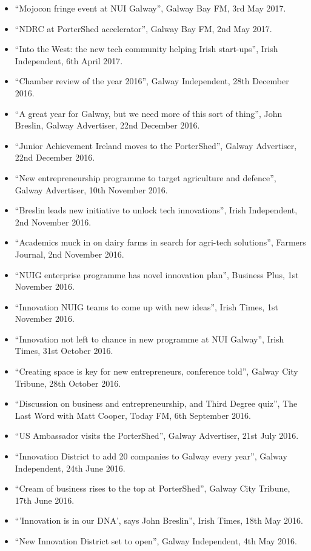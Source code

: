 \documentclass[10pt,a4paper]{res} %
\begin{document}
\begin{resume}
{\begin{itemize}
\item ``Mojocon fringe event at NUI Galway'', Galway Bay FM, 3rd May 2017.
\item ``NDRC at PorterShed accelerator'', Galway Bay FM, 2nd May 2017.
\item ``Into the West: the new tech community helping Irish start-ups'', Irish Independent, 6th April 2017.
\item ``Chamber review of the year 2016'', Galway Independent, 28th December 2016.
\item ``A great year for Galway, but we need more of this sort of thing'', John Breslin, Galway Advertiser, 22nd December 2016.
\item ``Junior Achievement Ireland moves to the PorterShed'', Galway Advertiser, 22nd December 2016.
\item ``New entrepreneurship programme to target agriculture and defence'', Galway Advertiser, 10th November 2016.
\item ``Breslin leads new initiative to unlock tech innovations'', Irish Independent, 2nd November 2016.
\item ``Academics muck in on dairy farms in search for agri-tech solutions'', Farmers Journal, 2nd November 2016.
\item ``NUIG enterprise programme has novel innovation plan'', Business Plus, 1st November 2016.
\item ``Innovation NUIG teams to come up with new ideas'', Irish Times, 1st November 2016.
\item ``Innovation not left to chance in new programme at NUI Galway'', Irish Times, 31st October 2016.
\item ``Creating space is key for new entrepreneurs, conference told'', Galway City Tribune, 28th October 2016.
\item ``Discussion on business and entrepreneurship, and Third Degree quiz'', The Last Word with Matt Cooper, Today FM, 6th September 2016.
\item ``US Ambassador visits the PorterShed'', Galway Advertiser, 21st July 2016.
\item ``Innovation District to add 20 companies to Galway every year'', Galway Independent, 24th June 2016.
\item ``Cream of business rises to the top at PorterShed'', Galway City Tribune, 17th June 2016.
\item ``'Innovation is in our DNA', says John Breslin'', Irish Times, 18th May 2016.
\item ``New Innovation District set to open'', Galway Independent, 4th May 2016.

\end{itemize}}
\end{resume}
\end{document}
